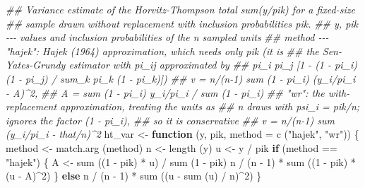 \documentclass[
  letterpaper,
  DIV=11,
  numbers=noendperiod]{scrreprt}
\newenvironment{Shaded}{\begin{snugshade}}{\end{snugshade}}
\newcommand{\AttributeTok}[1]{\textcolor[rgb]{0.40,0.45,0.13}{#1}}
\newcommand{\ControlFlowTok}[1]{\textcolor[rgb]{0.00,0.23,0.31}{\textbf{#1}}}
\newcommand{\DecValTok}[1]{\textcolor[rgb]{0.68,0.00,0.00}{#1}}
\newcommand{\DocumentationTok}[1]{\textcolor[rgb]{0.37,0.37,0.37}{\textit{#1}}}
\newcommand{\FunctionTok}[1]{\textcolor[rgb]{0.28,0.35,0.67}{#1}}
\newcommand{\NormalTok}[1]{\textcolor[rgb]{0.00,0.23,0.31}{#1}}
\newcommand{\OtherTok}[1]{\textcolor[rgb]{0.00,0.23,0.31}{#1}}
\newcommand{\SpecialCharTok}[1]{\textcolor[rgb]{0.37,0.37,0.37}{#1}}
\newcommand{\StringTok}[1]{\textcolor[rgb]{0.13,0.47,0.30}{#1}}
\renewcommand{\[}{\begin{equation}}
\renewcommand{\]}{\end{equation}}
\begin{document}
\begin{Shaded}
\begin{Highlighting}[]
\DocumentationTok{\#\# Variance estimate of the Horvitz{-}Thompson total sum(y/pik) for a fixed{-}size}
\DocumentationTok{\#\# sample drawn without replacement with inclusion probabilities pik.}
\DocumentationTok{\#\# y, pik {-}{-}{-} values and inclusion probabilities of the n sampled units}
\DocumentationTok{\#\# method {-}{-}{-} "hajek": Hajek (1964) approximation, which needs only pik (it is}
\DocumentationTok{\#\#            the Sen{-}Yates{-}Grundy estimator with pi\_ij approximated by}
\DocumentationTok{\#\#            pi\_i pi\_j [1 {-} (1 {-} pi\_i)(1 {-} pi\_j) / sum\_k pi\_k (1 {-} pi\_k)])}
\DocumentationTok{\#\#            v = n/(n{-}1) sum (1 {-} pi\_i) (y\_i/pi\_i {-} A)\^{}2,}
\DocumentationTok{\#\#            A = sum (1 {-} pi\_i) y\_i/pi\_i / sum (1 {-} pi\_i)}
\DocumentationTok{\#\#            "wr": the with{-}replacement approximation, treating the units as}
\DocumentationTok{\#\#            n draws with psi\_i = pik/n; ignores the factor (1 {-} pi\_i),}
\DocumentationTok{\#\#            so it is conservative}
\DocumentationTok{\#\#            v = n/(n{-}1) sum (y\_i/pi\_i {-} that/n)\^{}2}
\NormalTok{ht\_var }\OtherTok{\textless{}{-}} \ControlFlowTok{function}\NormalTok{ (y, pik, }\AttributeTok{method =} \FunctionTok{c}\NormalTok{ (}\StringTok{"hajek"}\NormalTok{, }\StringTok{"wr"}\NormalTok{))}
\NormalTok{\{}
\NormalTok{  method }\OtherTok{\textless{}{-}} \FunctionTok{match.arg}\NormalTok{ (method)}
\NormalTok{  n }\OtherTok{\textless{}{-}} \FunctionTok{length}\NormalTok{ (y)}
\NormalTok{  u }\OtherTok{\textless{}{-}}\NormalTok{ y }\SpecialCharTok{/}\NormalTok{ pik}
  \ControlFlowTok{if}\NormalTok{ (method }\SpecialCharTok{==} \StringTok{"hajek"}\NormalTok{)}
\NormalTok{  \{}
\NormalTok{    A }\OtherTok{\textless{}{-}} \FunctionTok{sum}\NormalTok{ ((}\DecValTok{1} \SpecialCharTok{{-}}\NormalTok{ pik) }\SpecialCharTok{*}\NormalTok{ u) }\SpecialCharTok{/} \FunctionTok{sum}\NormalTok{ (}\DecValTok{1} \SpecialCharTok{{-}}\NormalTok{ pik)}
\NormalTok{    n }\SpecialCharTok{/}\NormalTok{ (n }\SpecialCharTok{{-}} \DecValTok{1}\NormalTok{) }\SpecialCharTok{*} \FunctionTok{sum}\NormalTok{ ((}\DecValTok{1} \SpecialCharTok{{-}}\NormalTok{ pik) }\SpecialCharTok{*}\NormalTok{ (u }\SpecialCharTok{{-}}\NormalTok{ A)}\SpecialCharTok{\^{}}\DecValTok{2}\NormalTok{)}
\NormalTok{  \}}
  \ControlFlowTok{else}
\NormalTok{    n }\SpecialCharTok{/}\NormalTok{ (n }\SpecialCharTok{{-}} \DecValTok{1}\NormalTok{) }\SpecialCharTok{*} \FunctionTok{sum}\NormalTok{ ((u }\SpecialCharTok{{-}} \FunctionTok{sum}\NormalTok{ (u) }\SpecialCharTok{/}\NormalTok{ n)}\SpecialCharTok{\^{}}\DecValTok{2}\NormalTok{)}
\NormalTok{\}}


\end{Highlighting}
\end{Shaded}
\end{document}
